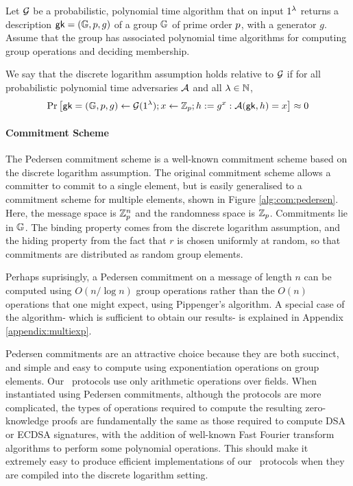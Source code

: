 Let $\mathcal{G}$ be a probabilistic, polynomial time algorithm that on input $1^{\lambda}$ returns a description $\mathsf{gk} = (\mathbb{G},p,g)$ of a group $\mathbb{G}$ of prime order $p$, with a generator $g$. Assume that the group has associated polynomial time algorithms for computing group operations and deciding membership.

We say that the discrete logarithm assumption holds relative to $\mathcal{G}$ if for all probabilistic polynomial time adversaries $\mathcal{A}$ and all $\lambda \in \mathbb{N}$,
$$ \Pr \left[ \mathsf{gk} = (\mathbb{G},p,g) \gets \mathcal{G}(1^{\lambda}); x \gets \mathbb{Z}_{p}; h := g^x : \mathcal{A}(\mathsf{gk},h)=x \right] \approx 0 $$

\paragraph{Commitment Scheme} The Pedersen commitment scheme \cite{Pedersen91} is a well-known commitment scheme based on the discrete logarithm assumption. The original commitment scheme allows a committer to commit to a single element, but is easily generalised to a commitment scheme for multiple elements, shown in Figure \ref{alg:com:pedersen}. Here, the message space is $\mathbb{Z}_p^n$ and the randomness space is $\mathbb{Z}_p$. Commitments lie in $\mathbb{G}$. The binding property comes from the discrete logarithm assumption, and the hiding property from the fact that $r$ is chosen uniformly at random, so that commitments are distributed as random group elements.

Perhaps suprisingly, a Pedersen commitment on a message of length $n$ can be computed using $O(n / \log n)$ group operations rather than the $O(n)$ operations that one might expect, using Pippenger's algorithm. A special case of the algorithm- which is sufficient to obtain our results- is explained in Appendix \ref{appendix:multiexp}.

Pedersen commitments are an attractive choice because they are both succinct, and simple and easy to compute using exponentiation operations on group elements. Our \ILC\ protocols use only arithmetic operations over fields. When instantiated using Pedersen commitments, although the protocols are more complicated, the types of operations required to compute the resulting zero-knowledge proofs are fundamentally the same as those required to compute DSA or ECDSA signatures, with the addition of well-known Fast Fourier transform algorithms to perform some polynomial operations. This should make it extremely easy to produce efficient implementations of our \ILC\ protocols when they are compiled into the discrete logarithm setting.

